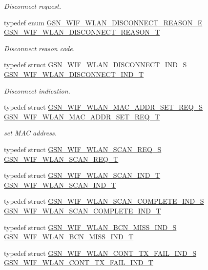 \begin{DoxyCompactItemize}
\begin{DoxyCompactList}\small\item\em Disconnect request. \end{DoxyCompactList}\item 
typedef enum \hyperlink{a00677_ga9dd854d0108dc49ff077a04e897e3518}{GSN\_\-WIF\_\-WLAN\_\-DISCONNECT\_\-REASON\_\-E} \hyperlink{a00677_ga59f311fc4d769ed3a162e48be5ea59aa}{GSN\_\-WIF\_\-WLAN\_\-DISCONNECT\_\-REASON\_\-T}
\begin{DoxyCompactList}\small\item\em Disconnect reason code. \end{DoxyCompactList}\item 
typedef struct \hyperlink{a00379}{GSN\_\-WIF\_\-WLAN\_\-DISCONNECT\_\-IND\_\-S} \hyperlink{a00677_ga12e53679e526d82e7e99a05a000dbdf8}{GSN\_\-WIF\_\-WLAN\_\-DISCONNECT\_\-IND\_\-T}
\begin{DoxyCompactList}\small\item\em Disconnect indication. \end{DoxyCompactList}\item 
typedef struct \hyperlink{a00388}{GSN\_\-WIF\_\-WLAN\_\-MAC\_\-ADDR\_\-SET\_\-REQ\_\-S} \hyperlink{a00677_ga013826a17b7a57eb4c9e4de16a91b6a7}{GSN\_\-WIF\_\-WLAN\_\-MAC\_\-ADDR\_\-SET\_\-REQ\_\-T}
\begin{DoxyCompactList}\small\item\em set MAC address. \end{DoxyCompactList}\item 
typedef struct \hyperlink{a00402}{GSN\_\-WIF\_\-WLAN\_\-SCAN\_\-REQ\_\-S} \hyperlink{a00677_ga3cb348310b077a03e1bc3f51a82dd842}{GSN\_\-WIF\_\-WLAN\_\-SCAN\_\-REQ\_\-T}
\item 
typedef struct \hyperlink{a00400}{GSN\_\-WIF\_\-WLAN\_\-SCAN\_\-IND\_\-T} \hyperlink{a00677_ga819e3d944fbed5505b12c711a018e6d5}{GSN\_\-WIF\_\-WLAN\_\-SCAN\_\-IND\_\-T}
\item 
typedef struct \hyperlink{a00399}{GSN\_\-WIF\_\-WLAN\_\-SCAN\_\-COMPLETE\_\-IND\_\-S} \hyperlink{a00677_ga211b533548257cf9bdfbb28798c2ffbd}{GSN\_\-WIF\_\-WLAN\_\-SCAN\_\-COMPLETE\_\-IND\_\-T}
\item 
typedef struct \hyperlink{a00371}{GSN\_\-WIF\_\-WLAN\_\-BCN\_\-MISS\_\-IND\_\-S} \hyperlink{a00677_ga8a5916f083421df057ab0d516ee4034d}{GSN\_\-WIF\_\-WLAN\_\-BCN\_\-MISS\_\-IND\_\-T}
\item 
typedef struct \hyperlink{a00377}{GSN\_\-WIF\_\-WLAN\_\-CONT\_\-TX\_\-FAIL\_\-IND\_\-S} \hyperlink{a00677_ga4ad9eacce4bc92ca4ff0473b8d2f7a48}{GSN\_\-WIF\_\-WLAN\_\-CONT\_\-TX\_\-FAIL\_\-IND\_\-T}

\end{DoxyCompactItemize}
